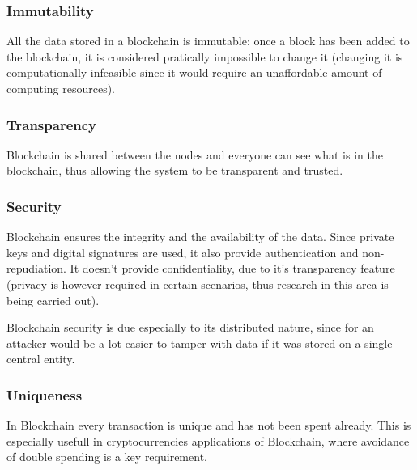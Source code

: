\subsubsection*{Immutability}
All the data stored in a blockchain is immutable: once a block has been added to
the blockchain, it is considered pratically impossible to change it (changing it
is computationally infeasible since it would require an unaffordable amount of
computing resources).

\subsubsection*{Transparency}
Blockchain is shared between the nodes and everyone can see what is in the
blockchain, thus allowing the system to be transparent and trusted.

\subsubsection*{Security}
Blockchain ensures the integrity and the availability of the data. Since
private keys and digital signatures are used, it also provide authentication and
non-repudiation. It doesn't provide confidentiality, due to it's transparency
feature (privacy is however required in certain scenarios, thus research in
this area is being carried out).

Blockchain security is due especially to its distributed nature, since for an
attacker would be a lot easier to tamper with data if it was stored on a single
central entity.

\subsubsection*{Uniqueness}
In Blockchain every transaction is unique and has not been spent already.
This is especially usefull in cryptocurrencies applications of Blockchain,
where avoidance of double spending is a key requirement.















